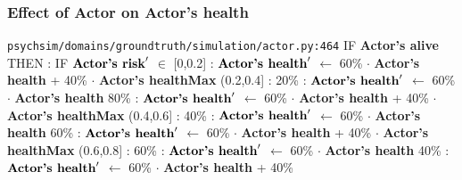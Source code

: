 \documentclass{article}%
\begin{document}
\subsubsection{Effect of Actor on Actor's health}%
\label{ssubsec:Effect of Actor on Actor's health}%
\begin{flushleft}%
\verb|psychsim/domains/groundtruth/simulation/actor.py:464|%
\linebreak%
IF %
\textbf{Actor's alive}%
\linebreak%
\hspace*{2em}%
THEN %
: %
IF %
$\mbox{\textbf{Actor's risk}} '$%
$\in$%
\linebreak%
\hspace*{4em}%
{[}0,0.2{]}%
: %
$\mbox{\textbf{Actor's health}} '$%
$\leftarrow$%
60\%%
$\cdot$%
\textbf{Actor's health}%
+%
40\%%
$\cdot$%
\textbf{Actor's healthMax}%
\linebreak%
\hspace*{4em}%
(0.2,0.4{]}%
: %
\linebreak%
\hspace*{6em}%
20\%%
: %
$\mbox{\textbf{Actor's health}} '$%
$\leftarrow$%
60\%%
$\cdot$%
\textbf{Actor's health}%
\linebreak%
\hspace*{6em}%
80\%%
: %
$\mbox{\textbf{Actor's health}} '$%
$\leftarrow$%
60\%%
$\cdot$%
\textbf{Actor's health}%
+%
40\%%
$\cdot$%
\textbf{Actor's healthMax}%
\linebreak%
\hspace*{4em}%
(0.4,0.6{]}%
: %
\linebreak%
\hspace*{6em}%
40\%%
: %
$\mbox{\textbf{Actor's health}} '$%
$\leftarrow$%
60\%%
$\cdot$%
\textbf{Actor's health}%
\linebreak%
\hspace*{6em}%
60\%%
: %
$\mbox{\textbf{Actor's health}} '$%
$\leftarrow$%
60\%%
$\cdot$%
\textbf{Actor's health}%
+%
40\%%
$\cdot$%
\textbf{Actor's healthMax}%
\linebreak%
\hspace*{4em}%
(0.6,0.8{]}%
: %
\linebreak%
\hspace*{6em}%
60\%%
: %
$\mbox{\textbf{Actor's health}} '$%
$\leftarrow$%
60\%%
$\cdot$%
\textbf{Actor's health}%
\linebreak%
\hspace*{6em}%
40\%%
: %
$\mbox{\textbf{Actor's health}} '$%
$\leftarrow$%
60\%%
$\cdot$%
\textbf{Actor's health}%
+%
40\%%

\end{flushleft}
\end{document}
